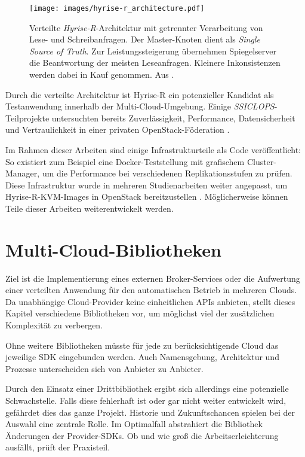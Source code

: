 	\begin{figure}[ht]
	\centering
	\texttt{[image: images/hyrise-r\_architecture.pdf]}
	\caption{Verteilte \emph{Hyrise-R}-Architektur mit getrennter Verarbeitung von Lese- und Schreibanfragen. Der Master-Knoten dient als \emph{Single Source of Truth}. Zur Leistungssteigerung übernehmen Spiegelserver die Beantwortung der meisten Leseanfragen. Kleinere Inkonsistenzen werden dabei in Kauf genommen. Aus \cite{ssiclops:d42:experiments-measurements}.}	
	\label{fig:hyrise-r}
\end{figure}

Durch die verteilte Architektur ist Hyrise-R ein potenzieller Kandidat als Testanwendung innerhalb der Multi-Cloud-Umgebung. Einige \emph{SSICLOPS}-Teilprojekte untersuchten bereits Zuverlässigkeit, Performance, Datensicherheit und Vertraulichkeit in einer privaten OpenStack-Föderation \cite{ssiclops:d23:security-extensions, ssiclops:d42:experiments-measurements, bastian:2017:openstack-policies}. 

Im Rahmen dieser Arbeiten sind einige Infrastrukturteile als Code veröffentlicht: So existiert zum Beispiel eine Docker-Teststellung mit grafischem Cluster-Manager, um die Performance bei verschiedenen Replikationsstufen zu prüfen. Diese Infrastruktur wurde in mehreren Studienarbeiten weiter angepasst, um Hyrise-R-KVM-Images in OpenStack bereitzustellen \cite{eschrig:2016:ssiclops-masterproject, maschler:2017:ssiclops-masterproject}. Möglicherweise können Teile dieser Arbeiten weiterentwickelt werden.


\section{Multi-Cloud-Bibliotheken}
\label{sec:bibliotheken}

Ziel ist die Implementierung eines externen Broker-Services oder die Aufwertung einer verteilten Anwendung für den automatischen Betrieb in mehreren Clouds. Da unabhängige Cloud-Provider keine einheitlichen APIs anbieten, stellt dieses Kapitel verschiedene Bibliotheken vor, um möglichst viel der zusätzlichen Komplexität zu verbergen.

Ohne weitere Bibliotheken müsste für jede zu berücksichtigende Cloud das jeweilige SDK eingebunden werden. Auch Namensgebung, Architektur und Prozesse unterscheiden sich von Anbieter zu Anbieter. 

Durch den Einsatz einer Drittbibliothek ergibt sich allerdings eine potenzielle Schwachstelle. Falls diese fehlerhaft ist oder gar nicht weiter entwickelt wird, gefährdet dies das ganze Projekt. Historie und Zukunftschancen spielen bei der Auswahl eine zentrale Rolle. Im Optimalfall abstrahiert die Bibliothek Änderungen der Provider-SDKs. Ob und wie groß die Arbeitserleichterung ausfällt, prüft der Praxisteil.


